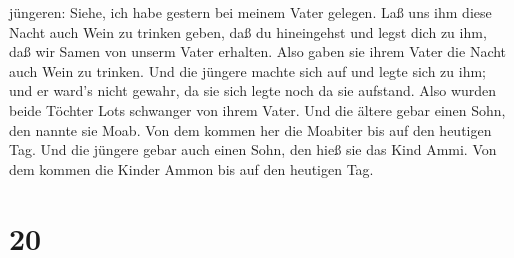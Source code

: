 jüngeren: Siehe, ich habe gestern bei meinem Vater gelegen. Laß uns ihm
diese Nacht auch Wein zu trinken geben, daß du hineingehst und legst
dich zu ihm, daß wir Samen von unserm Vater erhalten.  Also
gaben sie ihrem Vater die Nacht auch Wein zu trinken. Und die jüngere
machte sich auf und legte sich zu ihm; und er ward's nicht gewahr, da
sie sich legte noch da sie aufstand.  Also wurden beide
Töchter Lots schwanger von ihrem Vater.  Und die ältere
gebar einen Sohn, den nannte sie Moab. Von dem kommen her die Moabiter
bis auf den heutigen Tag.  Und die jüngere gebar auch einen
Sohn, den hieß sie das Kind Ammi. Von dem kommen die Kinder Ammon bis
auf den heutigen Tag.

\hypertarget{section-19}{%
\section{20}\label{section-19}}

